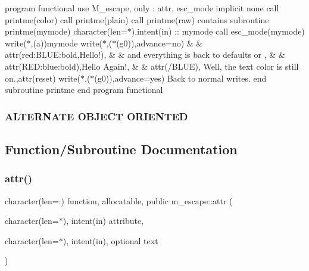 program functional use M\+\_\+escape, only \+: attr, esc\+\_\+mode implicit none call printme(\textquotesingle{}color\textquotesingle{}) call printme(\textquotesingle{}plain\textquotesingle{}) call printme(\textquotesingle{}raw\textquotesingle{}) contains subroutine printme(mymode) character(len=$\ast$),intent(in) \+:\+: mymode call esc\+\_\+mode(mymode) write($\ast$,\textquotesingle{}(a)\textquotesingle{})mymode write($\ast$,\textquotesingle{}($\ast$(g0))\textquotesingle{},advance=\textquotesingle{}no\textquotesingle{}) \& \& attr(\textquotesingle{}red\+:\+B\+L\+UE\+:bold\textquotesingle{},\textquotesingle{}Hello!\textquotesingle{}), \& \& \textquotesingle{}and everything is back to defaults or \textquotesingle{}, \& \& attr(\textquotesingle{}R\+E\+D\+:blue\+:bold\textquotesingle{}),\textquotesingle{}Hello Again!\textquotesingle{}, \& \& attr(\textquotesingle{}/\+B\+L\+UE\textquotesingle{}),\textquotesingle{} Well, the text color is still on.\textquotesingle{},attr(\textquotesingle{}reset\textquotesingle{}) write($\ast$,\textquotesingle{}($\ast$(g0))\textquotesingle{},advance=\textquotesingle{}yes\textquotesingle{})\textquotesingle{} Back to normal writes.\textquotesingle{} end subroutine printme end program functional

\subsubsection*{A\+L\+T\+E\+R\+N\+A\+TE O\+B\+J\+E\+CT O\+R\+I\+E\+N\+T\+ED}

\subsection{Function/\+Subroutine Documentation}
\mbox{\label{namespacem__escape_a916b16ce9be553d669f54cb9575a91be}} 
\subsubsection{\texorpdfstring{attr()}{attr()}}
{\footnotesize\ttfamily character(len=\+:) function, allocatable, public m\+\_\+escape\+::attr (\begin{DoxyParamCaption}\item[{character(len=$\ast$), intent(in)}]{attribute,  }\item[{character(len=$\ast$), intent(in), optional}]{text }\end{DoxyParamCaption})}



